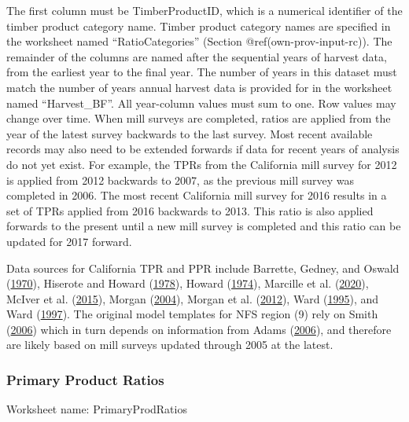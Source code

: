 \documentclass[
  openany]{book}
\begin{document}
The first column must be TimberProductID, which is a numerical
identifier of the timber product category name. Timber product category
names are specified in the worksheet named ``RatioCategories'' (Section
@ref(own-prov-input-rc)). The remainder of the columns are named after
the sequential years of harvest data, from the earliest year to the
final year. The number of years in this dataset must match the number of
years annual harvest data is provided for in the worksheet named
``Harvest\_BF''. All year-column values must sum to one. Row values may
change over time. When mill surveys are completed, ratios are applied
from the year of the latest survey backwards to the last survey. Most
recent available records may also need to be extended forwards if data
for recent years of analysis do not yet exist. For example, the TPRs
from the California mill survey for 2012 is applied from 2012 backwards
to 2007, as the previous mill survey was completed in 2006. The most
recent California mill survey for 2016 results in a set of TPRs applied
from 2016 backwards to 2013. This ratio is also applied forwards to the
present until a new mill survey is completed and this ratio can be
updated for 2017 forward.

Data sources for California TPR and PPR include Barrette, Gedney, and
Oswald (\protect\hyperlink{ref-barrette1970}{1970}), Hiserote and Howard
(\protect\hyperlink{ref-hiserote1978}{1978}), Howard
(\protect\hyperlink{ref-howard1974}{1974}), Marcille et al.
(\protect\hyperlink{ref-marcille2020}{2020}), McIver et al.
(\protect\hyperlink{ref-mciver2015}{2015}), Morgan
(\protect\hyperlink{ref-morgan2004}{2004}), Morgan et al.
(\protect\hyperlink{ref-morgan2012}{2012}), Ward
(\protect\hyperlink{ref-ward1995}{1995}), and Ward
(\protect\hyperlink{ref-ward1997}{1997}). The original model templates
for NFS region (9) rely on Smith
(\protect\hyperlink{ref-smith2006}{2006}) which in turn depends on
information from Adams (\protect\hyperlink{ref-adams2006}{2006}), and
therefore are likely based on mill surveys updated through 2005 at the
latest.

\hypertarget{own-prov-input-ppr}{%
\subsubsection{Primary Product Ratios}\label{own-prov-input-ppr}}

Worksheet name: PrimaryProdRatios
\end{document}
